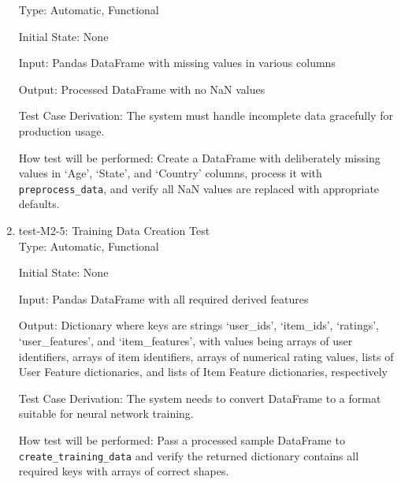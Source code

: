 \documentclass[12pt, titlepage]{article}
\begin{document}
\begin{enumerate}
  Type: Automatic, Functional

  Initial State: None

  Input: Pandas DataFrame with missing values in various columns

  Output: Processed DataFrame with no NaN values

  Test Case Derivation: The system must handle incomplete data gracefully for production usage.

  How test will be performed: Create a DataFrame with deliberately missing values in `Age', `State', and `Country' columns, process it with \texttt{preprocess\_data}, and verify all NaN values are replaced with appropriate defaults.
  \item{test-M2-5: Training Data Creation Test\\}
  Type: Automatic, Functional

  Initial State: None

  Input: Pandas DataFrame with all required derived features

  Output: Dictionary where keys are strings `user\_ids', `item\_ids', `ratings', `user\_features', and `item\_features', with values being arrays of user identifiers, arrays of item identifiers, arrays of numerical rating values, lists of User Feature dictionaries, and lists of Item Feature dictionaries, respectively

  Test Case Derivation: The system needs to convert DataFrame to a format suitable for neural network training.

  How test will be performed: Pass a processed sample DataFrame to \texttt{create\_training\_data} and verify the returned dictionary contains all required keys with arrays of correct shapes.
\end{enumerate}
\end{document}
